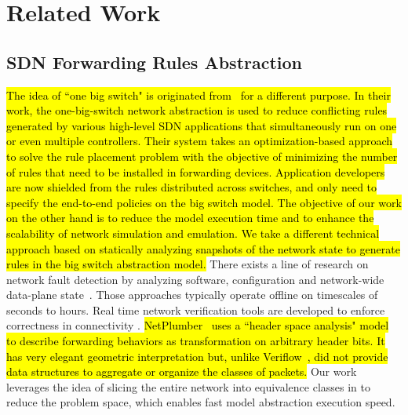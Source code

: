 \section{Related Work}
\label{Sec:relatedwork}

\subsection{SDN Forwarding Rules Abstraction}
\hl{
The idea of ``one big switch" is originated from~\mbox{\cite{OneBigSwitchAbstraction}} for a different purpose. In their work, the one-big-switch network abstraction is used to reduce conflicting rules generated by various high-level SDN applications that simultaneously run on one or even multiple controllers.
Their system takes an optimization-based approach to solve the rule placement problem with the objective of minimizing the number of rules that need to be installed in forwarding devices. Application developers are now shielded from the rules distributed across switches, and only need to specify the end-to-end policies on the big switch model. 
The objective of our work on the other hand is to reduce the model execution time and to enhance the scalability of network simulation and emulation. We take a different technical approach based on statically analyzing snapshots of the network state to generate rules in the big switch abstraction model.}
There exists a line of research on network fault detection by analyzing software,
configuration and network-wide data-plane state~\cite{Al-Shaer2010,Al-Shaer2009,Anteater2011,xz+05}.
Those approaches typically operate offline on timescales of seconds to hours.
Real time network verification tools are developed to enforce correctness in connectivity \cite{NetPlumber2013,Veriflow}.
\hl{
NetPlumber~\mbox{\cite{NetPlumber2013}} uses a ``header space analysis" model to
describe forwarding behaviors as transformation on arbitrary header bits.
It has very elegant geometric interpretation but, unlike Veriflow~\mbox{\cite{Veriflow}}, did not
provide data structures to aggregate or organize the classes of packets.
}
\fi
Our work leverages the idea of slicing the entire network into equivalence classes in \cite{Veriflow} to reduce the problem space, which enables fast model abstraction execution speed.


